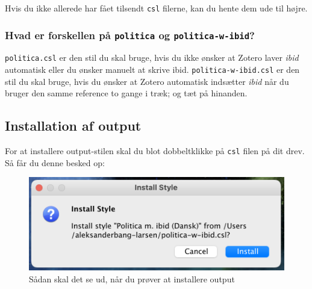 \documentclass[
  a4paper,
  DIV=11,
  numbers=noendperiod,
  oneside]{scrartcl}
\begin{document}

Hvis du ikke allerede har fået tilsendt \texttt{csl} filerne, kan du
hente dem ude til højre.

\subsubsection{\texorpdfstring{Hvad er forskellen på \texttt{politica}
og
\texttt{politica-w-ibid}?}{Hvad er forskellen på politica og politica-w-ibid?}}\label{hvad-er-forskellen-puxe5-politica-og-politica-w-ibid}

\texttt{politica.csl} er den stil du skal bruge, hvis du ikke ønsker at
Zotero laver \emph{ibid} automatisk eller du ønsker manuelt at skrive
ibid. \texttt{politica-w-ibid.csl} er den stil du skal bruge, hvis du
ønsker at Zotero automatisk indsætter \emph{ibid} når du bruger den
samme reference to gange i træk; og tæt på hinanden.

\subsection{Installation af output}\label{installation-af-output}

For at installere output-stilen skal du blot dobbeltklikke på
\texttt{csl} filen på dit drev. Så får du denne besked op:

\begin{figure}[tbh]

{\centering \includegraphics{images/output-install.png}

}

\caption{Sådan skal det se ud, når du prøver at installere output}

\end{figure}%
\end{document}

